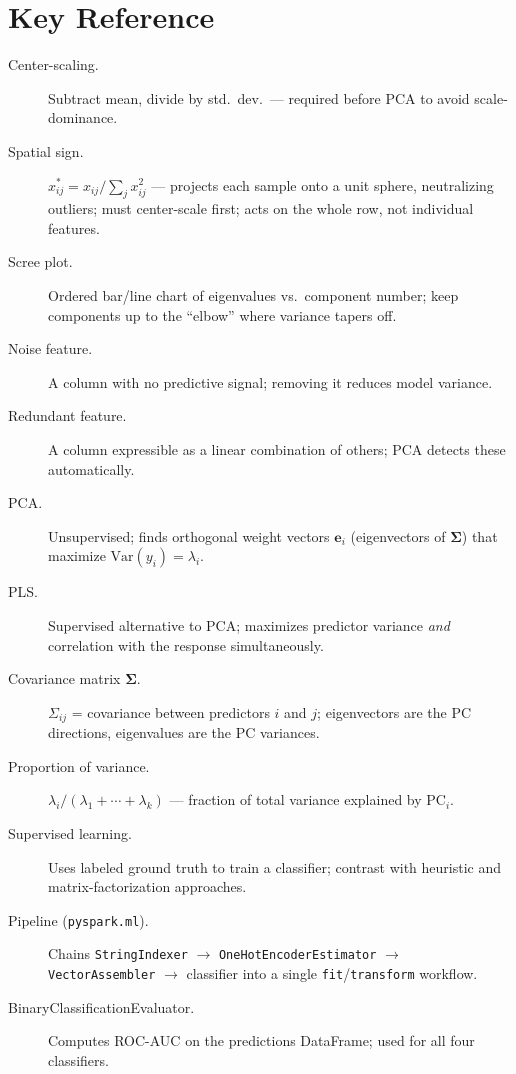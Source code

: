 \documentclass[11pt]{article}
\begin{document}
\section{Key Reference}

\begin{description}
    \item[Center-scaling.] Subtract mean, divide by std.\ dev.\ --- required before PCA to avoid scale-dominance.
    \item[Spatial sign.] $x_{ij}^{*} = x_{ij} / \sum_j x_{ij}^2$ --- projects each sample onto a unit sphere, neutralizing outliers; must center-scale first; acts on the whole row, not individual features.
    \item[Scree plot.] Ordered bar/line chart of eigenvalues vs.\ component number; keep components up to the ``elbow'' where variance tapers off.
    \item[Noise feature.] A column with no predictive signal; removing it reduces model variance.
    \item[Redundant feature.] A column expressible as a linear combination of others; PCA detects these automatically.
    \item[PCA.] Unsupervised; finds orthogonal weight vectors $\mathbf{e}_i$ (eigenvectors of $\boldsymbol{\Sigma}$) that maximize $\mathrm{Var}(y_i) = \lambda_i$.
    \item[PLS.] Supervised alternative to PCA; maximizes predictor variance \emph{and} correlation with the response simultaneously.
    \item[Covariance matrix $\boldsymbol{\Sigma}$.] $\Sigma_{ij}$ = covariance between predictors $i$ and $j$; eigenvectors are the PC directions, eigenvalues are the PC variances.
    \item[Proportion of variance.] $\lambda_i / (\lambda_1 + \cdots + \lambda_k)$ --- fraction of total variance explained by PC$_i$.
    \item[Supervised learning.] Uses labeled ground truth to train a classifier; contrast with heuristic and matrix-factorization approaches.
    \item[Pipeline (\texttt{pyspark.ml}).] Chains \texttt{StringIndexer} $\to$ \texttt{OneHotEncoderEstimator} $\to$ \texttt{VectorAssembler} $\to$ classifier into a single \texttt{fit}/\texttt{transform} workflow.
    \item[BinaryClassificationEvaluator.] Computes ROC-AUC on the predictions DataFrame; used for all four classifiers.

\end{description}
\end{document}
